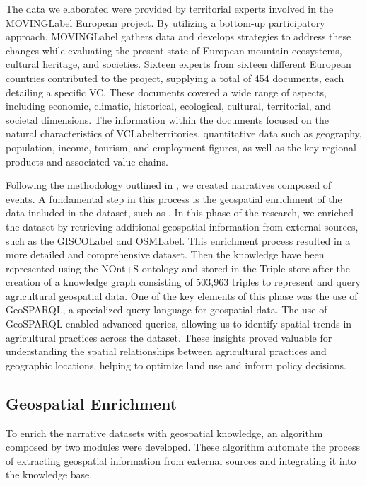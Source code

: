 The data we elaborated were provided by territorial experts involved in the \acrshort{MOVINGLabel} European project. By utilizing a bottom-up participatory approach, \acrshort{MOVINGLabel} gathers data and develops strategies to address these changes while evaluating the present state of European mountain ecosystems, cultural heritage, and societies. Sixteen experts from sixteen different European countries contributed to the project, supplying a total of 454 documents, each detailing a specific VC. These documents covered a wide range of aspects, including economic, climatic, historical, ecological, cultural, territorial, and societal dimensions. The information within the documents focused on the natural characteristics of \acrshort{VCLabel}territories, quantitative data such as geography, population, income, tourism, and employment figures, as well as the key regional products and associated value chains.

Following the methodology outlined in , we created narratives composed of events. A fundamental step in this process is the geospatial enrichment of the data included in the dataset, such as . In this phase of the research, we enriched the dataset by retrieving additional geospatial information from external sources, such as the \acrfull{GISCOLabel}\cite{GISCOEurostat} and \acrfull{OSMLabel}\cite{OpenStreetMap}. This enrichment process resulted in a more detailed and comprehensive dataset. Then the knowledge have been represented using the NOnt+S ontology and stored in the Triple store after the creation of a knowledge graph consisting of 503,963 triples to represent and query agricultural geospatial data. One of the key elements of this phase was the use of GeoSPARQL, a specialized query language for geospatial data. The use of GeoSPARQL enabled advanced queries, allowing us to identify spatial trends in agricultural practices across the dataset. These insights proved valuable for understanding the spatial relationships between agricultural practices and geographic locations, helping to optimize land use and inform policy decisions.

\subsection{Geospatial Enrichment}\label{VII-subsec:geospatialEnrichment}
To enrich the narrative datasets with geospatial knowledge, an algorithm composed by two modules were developed. These algorithm automate the process of extracting geospatial information from external sources and integrating it into the knowledge base.

